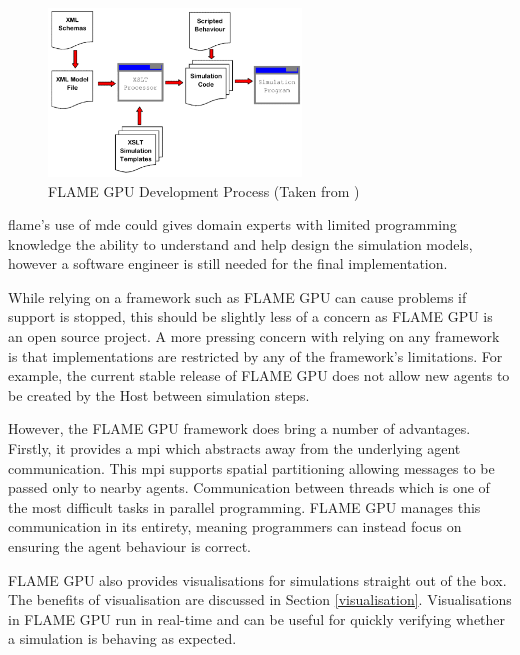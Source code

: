 \documentclass{UoYCSproject}
\begin{document}
\begin{figure}[htp]
\centering
\includegraphics[width=0.6\textwidth]{Appendix/FLAME_Process}
\caption{\gls{FLAME GPU} Development Process (Taken from \cite{flame_simulation})}
\label{fig:flame_dev}
\end{figure}

\gls{flame}'s use of \gls{mde} could gives domain experts with limited programming knowledge the ability to understand and help design the simulation models, however a software engineer is still needed for the final implementation.



While relying on a framework such as \gls{FLAME GPU} can cause problems if support is stopped, this should be slightly less of a concern as \gls{FLAME GPU} is an open source project.
A more pressing concern with relying on any framework is that implementations are restricted by any of the framework's limitations.
For example, the current stable release of \gls{FLAME GPU} does not allow new agents to be created by the \gls{Host} between simulation steps.

However, the \gls{FLAME GPU} framework does bring a number of advantages.
Firstly, it provides a \gls{mpi} which abstracts away from the underlying agent communication.
This \gls{mpi} supports spatial partitioning allowing messages to be passed only to nearby agents.
Communication between threads which is one of the most difficult tasks in parallel programming.
\gls{FLAME GPU} manages this communication in its entirety, meaning programmers can instead focus on ensuring the agent behaviour is correct.

\gls{FLAME GPU} also provides visualisations for simulations straight out of the box.
The benefits of visualisation are discussed in Section \ref{visualisation}.
Visualisations in \gls{FLAME GPU} run in real-time and can be useful for quickly verifying whether a simulation is behaving as expected.
\end{document}
